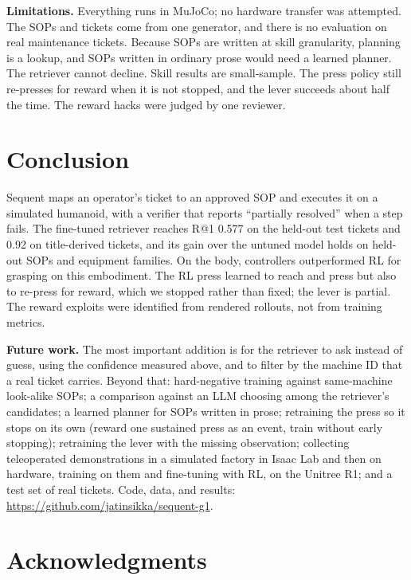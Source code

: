 \documentclass[
  10pt,
  twocolumn]{article}
\begin{document}
\textbf{Limitations.} Everything runs in MuJoCo; no hardware transfer
was attempted. The SOPs and tickets come from one generator, and there
is no evaluation on real maintenance tickets. Because SOPs are written
at skill granularity, planning is a lookup, and SOPs written in ordinary
prose would need a learned planner. The retriever cannot decline. Skill
results are small-sample. The press policy still re-presses for reward
when it is not stopped, and the lever succeeds about half the time. The
reward hacks were judged by one reviewer.

\section{Conclusion}\label{conclusion}

Sequent maps an operator's ticket to an approved SOP and executes it on
a simulated humanoid, with a verifier that reports ``partially
resolved'' when a step fails. The fine-tuned retriever reaches R@1 0.577
on the held-out test tickets and 0.92 on title-derived tickets, and its
gain over the untuned model holds on held-out SOPs and equipment
families. On the body, controllers outperformed RL for grasping on this
embodiment. The RL press learned to reach and press but also to re-press
for reward, which we stopped rather than fixed; the lever is partial.
The reward exploits were identified from rendered rollouts, not from
training metrics.

\textbf{Future work.} The most important addition is for the retriever
to ask instead of guess, using the confidence measured above, and to
filter by the machine ID that a real ticket carries. Beyond that:
hard-negative training against same-machine look-alike SOPs; a
comparison against an LLM choosing among the retriever's candidates; a
learned planner for SOPs written in prose; retraining the press so it
stops on its own (reward one sustained press as an event, train without
early stopping); retraining the lever with the missing observation;
collecting teleoperated demonstrations in a simulated factory in Isaac
Lab and then on hardware, training on them and fine-tuning with RL, on
the Unitree R1; and a test set of real tickets. Code, data, and results:
\url{https://github.com/jatinsikka/sequent-g1}.

\section*{Acknowledgments}\label{acknowledgments}
\end{document}
